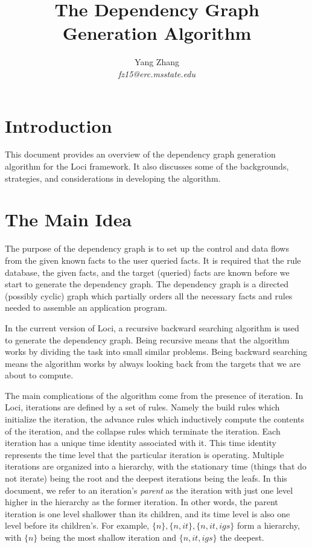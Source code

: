 \documentclass{article}
\begin{document}
\title{The Dependency Graph Generation Algorithm}

\author{ Yang Zhang \\
\it fz15@erc.msstate.edu}

\maketitle


\section{Introduction}

This document provides an overview of the dependency graph generation
algorithm for the Loci framework. It also discusses some of the
backgrounds, strategies, and considerations in developing the
algorithm.

\section{The Main Idea}
\label{sec:main}
The purpose of the dependency graph is to set up the control and data
flows from the given known facts to the user queried facts. It is
required that the rule database, the given facts, and the target
(queried) facts are known before we start to generate the dependency
graph. The dependency graph is a directed (possibly cyclic) graph
which partially orders all the necessary facts and rules needed to
assemble an application program. 

In the current version of Loci, a recursive backward searching
algorithm is used to generate the dependency graph. Being recursive
means that the algorithm works by dividing the task into small similar
problems. Being backward searching means the algorithm works by
always looking back from the targets that we are about to compute. 

The main complications of the algorithm come from the presence of
iteration. In Loci, iterations are defined by a set of rules. Namely
the build rules which initialize the iteration, the advance rules
which inductively compute the contents of the iteration, and the
collapse rules which terminate the iteration. Each iteration has a
unique time identity associated with it. This time identity represents
the time level that the particular iteration is operating. Multiple
iterations are organized into a hierarchy, with the stationary time
(things that do not iterate) being the root and the deepest iterations
being the leafs. In this document, we refer to an iteration's 
{\it parent} as the iteration with just one level higher in the
hierarchy as the former iteration. In other words, the parent
iteration is one level shallower than its children, and its time level
is also one level
before its children's. For example, $\{n\}, \{n,it\}, \{n,it,igs\}$
form a hierarchy, with $\{n\}$ being the most shallow iteration and
$\{n,it,igs\}$ the deepest.
\end{document}
